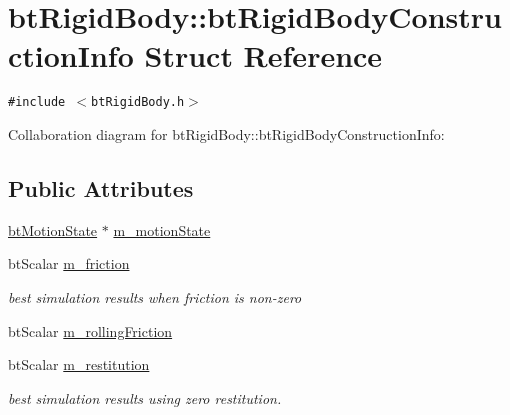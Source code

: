 \hypertarget{structbt_rigid_body_1_1bt_rigid_body_construction_info}{
\section{btRigidBody::btRigidBodyConstructionInfo Struct Reference}
\label{structbt_rigid_body_1_1bt_rigid_body_construction_info}
}
{\tt \#include $<$btRigidBody.h$>$}

Collaboration diagram for btRigidBody::btRigidBodyConstructionInfo:\subsection*{Public Attributes}
\begin{CompactItemize}
\item 
\hyperlink{classbt_motion_state}{btMotionState} $\ast$ \hyperlink{structbt_rigid_body_1_1bt_rigid_body_construction_info_729b0b79412f36ac983d4adafbffa429}{m\_\-motionState}
\item 
\hypertarget{structbt_rigid_body_1_1bt_rigid_body_construction_info_096d36f8308c4ca9b225d7c7ad43a0bf}{
btScalar \hyperlink{structbt_rigid_body_1_1bt_rigid_body_construction_info_096d36f8308c4ca9b225d7c7ad43a0bf}{m\_\-friction}}
\label{structbt_rigid_body_1_1bt_rigid_body_construction_info_096d36f8308c4ca9b225d7c7ad43a0bf}

\begin{CompactList}\small\item\em best simulation results when friction is non-zero \item\end{CompactList}\item 
btScalar \hyperlink{structbt_rigid_body_1_1bt_rigid_body_construction_info_bb72d0a00d035d2224a927810e9ed972}{m\_\-rollingFriction}
\item 
\hypertarget{structbt_rigid_body_1_1bt_rigid_body_construction_info_4cee9df6cc734b50e0ef7c7a4eeb43d8}{
btScalar \hyperlink{structbt_rigid_body_1_1bt_rigid_body_construction_info_4cee9df6cc734b50e0ef7c7a4eeb43d8}{m\_\-restitution}}
\label{structbt_rigid_body_1_1bt_rigid_body_construction_info_4cee9df6cc734b50e0ef7c7a4eeb43d8}

\begin{CompactList}\small\item\em best simulation results using zero restitution. \item\end{CompactList}\end{CompactItemize}


